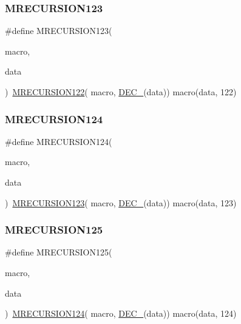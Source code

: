 \subsubsection{\texorpdfstring{MRECURSION123}{MRECURSION123}}
{\footnotesize\ttfamily \#define M\+R\+E\+C\+U\+R\+S\+I\+O\+N123(\begin{DoxyParamCaption}\item[{}]{macro,  }\item[{}]{data }\end{DoxyParamCaption})~\mbox{\hyperlink{group__group__sam0__utils__mrecursion_ga03c32f49f3c98b918cb9924148830594}{M\+R\+E\+C\+U\+R\+S\+I\+O\+N122}}(  macro, \mbox{\hyperlink{group__group__sam0__utils__mrecursion_ga1d23d683797679dca8c3512a54a5dcae}{D\+E\+C\+\_\+}}(data))   macro(data, 122)}

\mbox{\label{group__group__sam0__utils__mrecursion_ga954c2a20af7ae897731bdf294cdcbc5a}} 
\subsubsection{\texorpdfstring{MRECURSION124}{MRECURSION124}}
{\footnotesize\ttfamily \#define M\+R\+E\+C\+U\+R\+S\+I\+O\+N124(\begin{DoxyParamCaption}\item[{}]{macro,  }\item[{}]{data }\end{DoxyParamCaption})~\mbox{\hyperlink{group__group__sam0__utils__mrecursion_ga30375f3389d17c9a74c638545b293447}{M\+R\+E\+C\+U\+R\+S\+I\+O\+N123}}(  macro, \mbox{\hyperlink{group__group__sam0__utils__mrecursion_ga1d23d683797679dca8c3512a54a5dcae}{D\+E\+C\+\_\+}}(data))   macro(data, 123)}

\mbox{\label{group__group__sam0__utils__mrecursion_gae1c7af2acfa6b9eaef99a5da874a9f59}} 
\subsubsection{\texorpdfstring{MRECURSION125}{MRECURSION125}}
{\footnotesize\ttfamily \#define M\+R\+E\+C\+U\+R\+S\+I\+O\+N125(\begin{DoxyParamCaption}\item[{}]{macro,  }\item[{}]{data }\end{DoxyParamCaption})~\mbox{\hyperlink{group__group__sam0__utils__mrecursion_ga954c2a20af7ae897731bdf294cdcbc5a}{M\+R\+E\+C\+U\+R\+S\+I\+O\+N124}}(  macro, \mbox{\hyperlink{group__group__sam0__utils__mrecursion_ga1d23d683797679dca8c3512a54a5dcae}{D\+E\+C\+\_\+}}(data))   macro(data, 124)}


